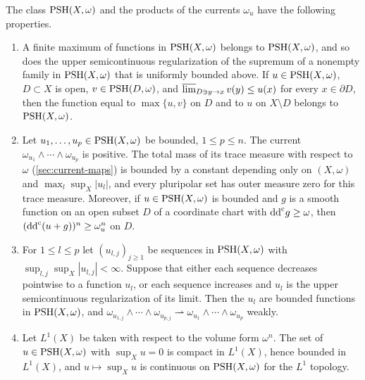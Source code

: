 \begin{lemma}\label{lem:hermitian-bounded-products}
The class $\mathrm{PSH}(X,\omega)$ and the products of the currents $\omega_u$ have the following properties.
\begin{enumerate}
\item A finite maximum of functions in $\mathrm{PSH}(X,\omega)$ belongs to $\mathrm{PSH}(X,\omega)$, and so does the upper semicontinuous regularization of the supremum of a nonempty family in $\mathrm{PSH}(X,\omega)$ that is uniformly bounded above. If $u\in\mathrm{PSH}(X,\omega)$, $D\subset X$ is open, $v\in\mathrm{PSH}(D,\omega)$, and $\varlimsup_{D\ni y\to x}v(y)\leq u(x)$ for every $x\in\partial D$, then the function equal to $\max\{u,v\}$ on $D$ and to $u$ on $X\setminus D$ belongs to $\mathrm{PSH}(X,\omega)$.
\item Let $u_1,\ldots,u_p\in\mathrm{PSH}(X,\omega)$ be bounded, $1\leq p\leq n$. The current $\omega_{u_1}\wedge\cdots\wedge\omega_{u_p}$ is positive. The total mass of its trace measure with respect to $\omega$ (\cref{sec:current-maps}) is bounded by a constant depending only on $(X,\omega)$ and $\max_l\sup_X|u_l|$, and every pluripolar set has outer measure zero for this trace measure. Moreover, if $u\in\mathrm{PSH}(X,\omega)$ is bounded and $g$ is a smooth function on an open subset $D$ of a coordinate chart with $\mathrm{dd}^{\mathrm{c}} g\geq\omega$, then $(\mathrm{dd}^{\mathrm{c}}(u+g))^n\geq\omega_u^n$ on $D$.
\item For $1\leq l\leq p$ let $(u_{l,j})_{j\geq1}$ be sequences in $\mathrm{PSH}(X,\omega)$ with $\sup_{l,j}\sup_X|u_{l,j}|<\infty$. Suppose that either each sequence decreases pointwise to a function $u_l$, or each sequence increases and $u_l$ is the upper semicontinuous regularization of its limit. Then the $u_l$ are bounded functions in $\mathrm{PSH}(X,\omega)$, and $\omega_{u_{1,j}}\wedge\cdots\wedge\omega_{u_{p,j}}\rightharpoonup\omega_{u_1}\wedge\cdots\wedge\omega_{u_p}$ weakly.
\item Let $L^1(X)$ be taken with respect to the volume form $\omega^n$. The set of $u\in\mathrm{PSH}(X,\omega)$ with $\sup_Xu=0$ is compact in $L^1(X)$, hence bounded in $L^1(X)$, and $u\mapsto\sup_Xu$ is continuous on $\mathrm{PSH}(X,\omega)$ for the $L^1$ topology.
\end{enumerate}
\end{lemma}

